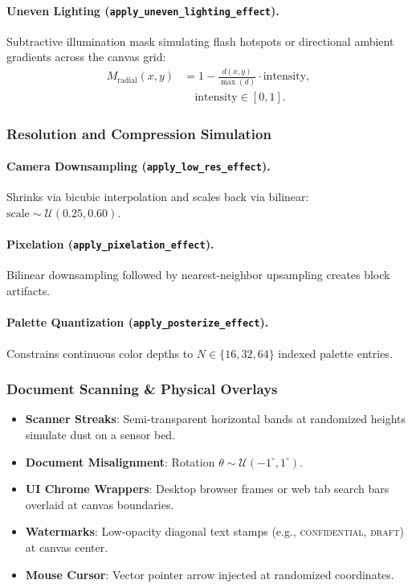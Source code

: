 \documentclass[11pt,twocolumn]{article}
\begin{document}
\paragraph{Uneven Lighting (\texttt{apply\_uneven\_lighting\_effect}).} Subtractive illumination mask simulating flash hotspots or directional ambient gradients across the canvas grid:
\begin{align}\label{eq:uneven_light}
  M_{\text{radial}}(x,y) &= 1 - \frac{d(x,y)}{\max(d)}\cdot\text{intensity}, \nonumber\\
  &\quad \text{intensity} \in [0,1].
\end{align}

\subsubsection{Resolution and Compression Simulation}\label{sec:resolution}

\paragraph{Camera Downsampling (\texttt{apply\_low\_res\_effect}).} Shrinks via bicubic interpolation and scales back via bilinear: $\text{scale} \sim \mathcal{U}(0.25, 0.60)$.

\paragraph{Pixelation (\texttt{apply\_pixelation\_effect}).} Bilinear downsampling followed by nearest-neighbor upsampling creates block artifacts.

\paragraph{Palette Quantization (\texttt{apply\_posterize\_effect}).} Constrains continuous color depths to $N \in \{16, 32, 64\}$ indexed palette entries.

\subsubsection{Document Scanning \& Physical Overlays}\label{sec:scanning}

\begin{itemize}[nosep]
  \item \textbf{Scanner Streaks}: Semi-transparent horizontal bands at randomized heights simulate dust on a sensor bed.
  \item \textbf{Document Misalignment}: Rotation $\theta \sim \mathcal{U}(-1^\circ, 1^\circ)$.
  \item \textbf{UI Chrome Wrappers}: Desktop browser frames or web tab search bars overlaid at canvas boundaries.
  \item \textbf{Watermarks}: Low-opacity diagonal text stamps (e.g., \textsc{confidential}, \textsc{draft}) at canvas center.
  \item \textbf{Mouse Cursor}: Vector pointer arrow injected at randomized coordinates.
\end{itemize}
\end{document}

